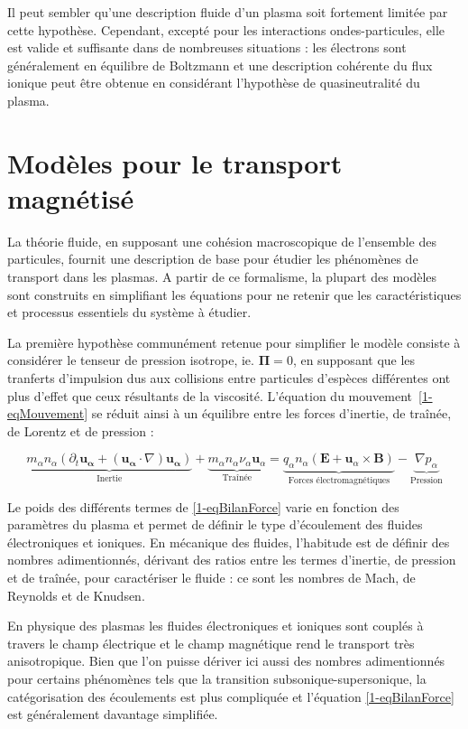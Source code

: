 \begin{refsection}
Il peut sembler qu'une description fluide d'un plasma soit fortement limitée
par cette hypothèse. Cependant, excepté pour les interactions
ondes-particules, elle est valide et suffisante dans de nombreuses
situations : les électrons sont généralement en équilibre de Boltzmann et une
description cohérente du flux ionique peut être obtenue en considérant l'hypothèse de quasineutralité du
plasma.

\section{Modèles pour le transport magnétisé}

La théorie fluide, en supposant une cohésion macroscopique de l'ensemble des
particules, fournit une description de base pour étudier les phénomènes de
transport dans les plasmas. A partir de ce formalisme, la plupart des modèles
sont construits en simplifiant les équations pour ne retenir que les
caractéristiques et processus essentiels du système à étudier. 

La première hypothèse communément retenue pour simplifier le modèle consiste à
considérer le tenseur de pression isotrope, ie.
$\boldsymbol{\Pi}=0$, en supposant que les tranferts d'impulsion dus
aux collisions entre particules d'espèces différentes ont plus d'effet que
ceux résultants de la viscosité. L'équation du
mouvement~\eqref{1-eqMouvement} se réduit ainsi à un équilibre entre les forces
d'inertie, de traînée, de Lorentz et de pression :

\begin{equation}
\label{1-eqBilanForce}
\underbrace{m_\alpha n_\alpha\left(\partial_t \mathbf{u_\alpha} +
(\mathbf{u_\alpha}\cdot\nabla)\mathbf{u_\alpha}\right)}_\text{Inertie}
+\underbrace{m_\alpha n_\alpha\nu_\alpha\mathbf
u_\alpha}_\text{Traînée}=\underbrace{{q_\alpha n_\alpha}\left(\mathbf E+\mathbf
u_\alpha\times \mathbf B\right)}_\text{Forces électromagnétiques}
-\underbrace{{\nabla p_\alpha}}_\text{Pression}
\end{equation}
 
Le poids des différents termes de \eqref{1-eqBilanForce} varie en fonction des
paramètres du plasma et permet de définir le type d'écoulement des fluides
électroniques et ioniques. En mécanique des fluides, l'habitude est de définir
des nombres adimentionnés, dérivant des ratios entre les termes d'inertie, de
pression et de traînée, pour caractériser le fluide : ce sont les nombres de
Mach, de Reynolds et de Knudsen.

En physique des plasmas les fluides électroniques et ioniques sont couplés à
travers le champ électrique et le champ magnétique rend le transport très
anisotropique. Bien que l'on puisse dériver ici aussi des nombres
adimentionnés pour certains phénomènes tels que la transition
subsonique-supersonique, la catégorisation des écoulements est plus compliquée
et l'équation \eqref{1-eqBilanForce} est généralement davantage simplifiée.
  

\end{refsection}
